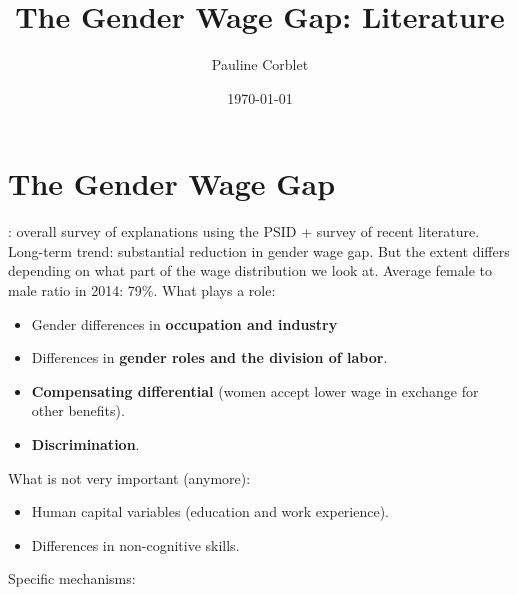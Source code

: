 \documentclass[12pt]{article}
\title{The Gender Wage Gap: Literature}
\author{Pauline Corblet}
\date{\today}
\begin{document}
  \maketitle

  \section{The Gender Wage Gap}
  \cite{blauGenderWageGap2017}: overall survey of explanations using the PSID + survey of recent literature. Long-term trend: substantial reduction in gender wage gap. But the extent differs depending on what part of the wage distribution we look at. Average female to male ratio in 2014: 79\%. What plays a role:
  \begin{itemize}
    \item Gender differences in \textbf{occupation and industry}
    \item Differences in \textbf{gender roles and the division of labor}.
    \item \textbf{Compensating differential} (women accept lower wage in exchange for other benefits).
    \item \textbf{Discrimination}.
  \end{itemize}
  What is not very important (anymore):
  \begin{itemize}
   \item Human capital variables (education and work experience).
   \item Differences in non-cognitive skills.
  \end{itemize}
  Specific mechanisms:
\end{document}
